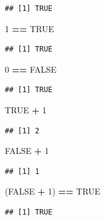 \documentclass[]{book}
\newenvironment{Shaded}{\begin{snugshade}}{\end{snugshade}}
\newcommand{\DecValTok}[1]{\textcolor[rgb]{0.00,0.00,0.81}{#1}}
\newcommand{\NormalTok}[1]{#1}
\newcommand{\OperatorTok}[1]{\textcolor[rgb]{0.81,0.36,0.00}{\textbf{#1}}}
\newcommand{\OtherTok}[1]{\textcolor[rgb]{0.56,0.35,0.01}{#1}}
\newcommand{\StringTok}[1]{\textcolor[rgb]{0.31,0.60,0.02}{#1}}
\begin{document}
\begin{verbatim}
## [1] TRUE
\end{verbatim}

\begin{Shaded}
\begin{Highlighting}[]
\DecValTok{1} \OperatorTok{==}\StringTok{ }\OtherTok{TRUE}
\end{Highlighting}
\end{Shaded}

\begin{verbatim}
## [1] TRUE
\end{verbatim}

\begin{Shaded}
\begin{Highlighting}[]
\DecValTok{0} \OperatorTok{==}\StringTok{ }\OtherTok{FALSE}
\end{Highlighting}
\end{Shaded}

\begin{verbatim}
## [1] TRUE
\end{verbatim}

\begin{Shaded}
\begin{Highlighting}[]
\OtherTok{TRUE} \OperatorTok{+}\StringTok{ }\DecValTok{1}
\end{Highlighting}
\end{Shaded}

\begin{verbatim}
## [1] 2
\end{verbatim}

\begin{Shaded}
\begin{Highlighting}[]
\OtherTok{FALSE} \OperatorTok{+}\StringTok{ }\DecValTok{1}
\end{Highlighting}
\end{Shaded}

\begin{verbatim}
## [1] 1
\end{verbatim}

\begin{Shaded}
\begin{Highlighting}[]
\NormalTok{(}\OtherTok{FALSE} \OperatorTok{+}\StringTok{ }\DecValTok{1}\NormalTok{) }\OperatorTok{==}\StringTok{ }\OtherTok{TRUE}
\end{Highlighting}
\end{Shaded}

\begin{verbatim}
## [1] TRUE
\end{verbatim}
\end{document}
